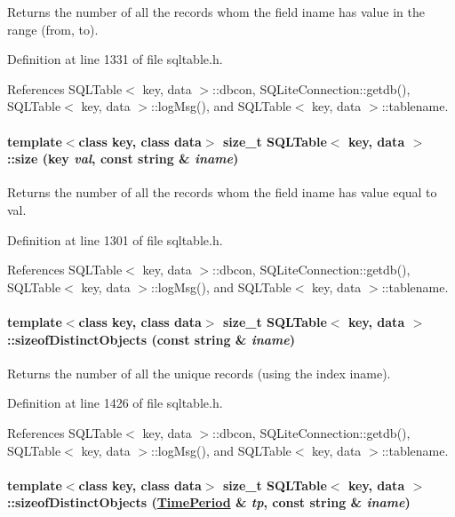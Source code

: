 Returns the number of all the records whom the field iname has value in the range (from, to). 

Definition at line 1331 of file sqltable.h.

References SQLTable$<$ key, data $>$::dbcon, SQLite\-Connection::getdb(), SQLTable$<$ key, data $>$::log\-Msg(), and SQLTable$<$ key, data $>$::tablename.\hypertarget{classSQLTable_SQLTablea25}{
\paragraph[size]{\setlength{\rightskip}{0pt plus 5cm}template$<$class key, class data$>$ size\_\-t SQLTable$<$ key, data $>$::size (key {\em val}, const string \& {\em iname})}\hfill}
\label{classSQLTable_SQLTablea25}


Returns the number of all the records whom the field iname has value equal to val. 

Definition at line 1301 of file sqltable.h.

References SQLTable$<$ key, data $>$::dbcon, SQLite\-Connection::getdb(), SQLTable$<$ key, data $>$::log\-Msg(), and SQLTable$<$ key, data $>$::tablename.\hypertarget{classSQLTable_SQLTablea31}{
\paragraph[sizeofDistinctObjects]{\setlength{\rightskip}{0pt plus 5cm}template$<$class key, class data$>$ size\_\-t SQLTable$<$ key, data $>$::sizeof\-Distinct\-Objects (const string \& {\em iname})}\hfill}
\label{classSQLTable_SQLTablea31}


Returns the number of all the unique records (using the index iname). 

Definition at line 1426 of file sqltable.h.

References SQLTable$<$ key, data $>$::dbcon, SQLite\-Connection::getdb(), SQLTable$<$ key, data $>$::log\-Msg(), and SQLTable$<$ key, data $>$::tablename.\hypertarget{classSQLTable_SQLTablea30}{
\paragraph[sizeofDistinctObjects]{\setlength{\rightskip}{0pt plus 5cm}template$<$class key, class data$>$ size\_\-t SQLTable$<$ key, data $>$::sizeof\-Distinct\-Objects (\hyperlink{classTimePeriod}{Time\-Period} \& {\em tp}, const string \& {\em iname})}\hfill}
\label{classSQLTable_SQLTablea30}



